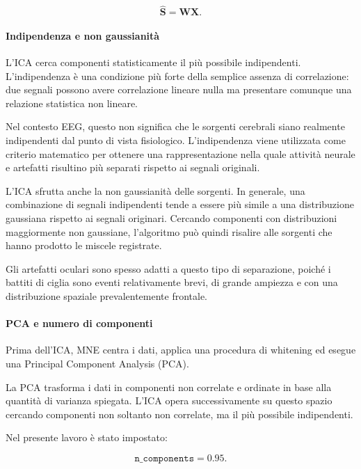 \begin{equation}
	\widehat{\mathbf{S}}
	=
	\mathbf{W}\mathbf{X}.
\end{equation}


\paragraph{Indipendenza e non gaussianità}

L'ICA cerca componenti statisticamente il più possibile indipendenti.
L'indipendenza è una condizione più forte della semplice assenza di
correlazione: due segnali possono avere correlazione lineare nulla ma
presentare comunque una relazione statistica non lineare.

Nel contesto EEG, questo non significa che le sorgenti cerebrali siano
realmente indipendenti dal punto di vista fisiologico. L'indipendenza
viene utilizzata come criterio matematico per ottenere una
rappresentazione nella quale attività neurale e artefatti risultino
più separati rispetto ai segnali originali.

L'ICA sfrutta anche la non gaussianità delle sorgenti. In generale,
una combinazione di segnali indipendenti tende a essere più simile a
una distribuzione gaussiana rispetto ai segnali originari. Cercando
componenti con distribuzioni maggiormente non gaussiane, l'algoritmo
può quindi risalire alle sorgenti che hanno prodotto le miscele
registrate.

Gli artefatti oculari sono spesso adatti a questo tipo di separazione,
poiché i battiti di ciglia sono eventi relativamente brevi, di grande
ampiezza e con una distribuzione spaziale prevalentemente frontale.


\paragraph{PCA e numero di componenti}

Prima dell'ICA, MNE centra i dati, applica una procedura di whitening
ed esegue una Principal Component Analysis (PCA).

La PCA trasforma i dati in componenti non correlate e ordinate in base
alla quantità di varianza spiegata. L'ICA opera successivamente su
questo spazio cercando componenti non soltanto non correlate, ma il
più possibile indipendenti.


Nel presente lavoro è stato impostato:

\begin{equation}
	\texttt{n\_components}=0.95.
\end{equation}

